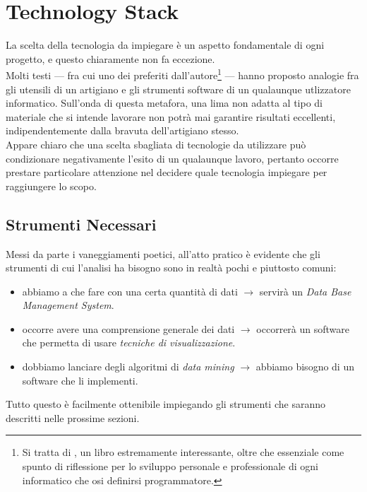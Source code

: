 \chapter{Technology Stack}

La scelta della tecnologia da impiegare è un aspetto fondamentale di ogni progetto, e questo chiaramente non fa eccezione. \\

Molti testi --- fra cui uno dei preferiti dall'autore\footnote{Si tratta di \cite{pragmatic}, un libro estremamente interessante, oltre che essenziale come spunto di riflessione per lo sviluppo personale e professionale di ogni informatico che osi definirsi programmatore.} --- hanno proposto analogie fra gli utensili di un artigiano e gli strumenti software di un qualaunque utlizzatore informatico. Sull'onda di questa metafora, una lima non adatta al tipo di materiale che si intende lavorare non potrà mai garantire risultati eccellenti, indipendentemente dalla bravuta dell'artigiano stesso. \\

Appare chiaro che una scelta sbagliata di tecnologie da utilizzare può condizionare negativamente l'esito di un qualaunque lavoro, pertanto occorre prestare particolare attenzione nel decidere quale tecnologia impiegare per raggiungere lo scopo.

\section{Strumenti Necessari}

    Messi da parte i vaneggiamenti poetici, all'atto pratico è evidente che gli strumenti di cui l'analisi ha bisogno sono in realtà pochi e piuttosto comuni:

    \begin{itemize}
        \item abbiamo a che fare con una certa quantità di dati $\rightarrow$ servirà un \textit{Data Base Management System}.
        \item occorre avere una comprensione generale dei dati $\rightarrow$ occorrerà un software che permetta di usare \textit{tecniche di visualizzazione}.
        \item dobbiamo lanciare degli algoritmi di \textit{data mining} $\rightarrow$ abbiamo bisogno di un software che li implementi.
    \end{itemize}

    Tutto questo è facilmente ottenibile impiegando gli strumenti che saranno descritti nelle prossime sezioni.

